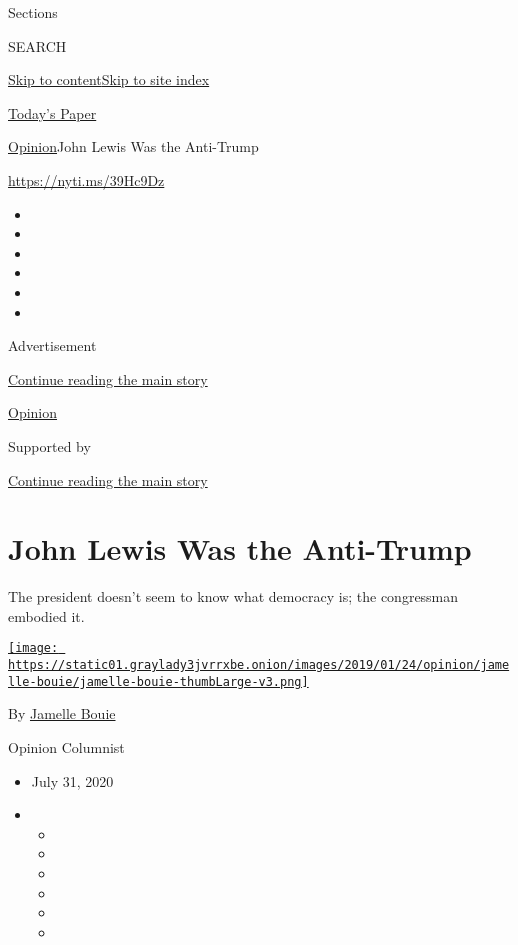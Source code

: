Sections

SEARCH

\protect\hyperlink{site-content}{Skip to
content}\protect\hyperlink{site-index}{Skip to site index}

\href{https://myaccount.nytimes3xbfgragh.onion/auth/login?response_type=cookie\&client_id=vi}{}

\href{https://www.nytimes3xbfgragh.onion/section/todayspaper}{Today's
Paper}

\href{/section/opinion}{Opinion}\textbar{}John Lewis Was the Anti-Trump

\url{https://nyti.ms/39Hc9Dz}

\begin{itemize}
\item
\item
\item
\item
\item
\item
\end{itemize}

Advertisement

\protect\hyperlink{after-top}{Continue reading the main story}

\href{/section/opinion}{Opinion}

Supported by

\protect\hyperlink{after-sponsor}{Continue reading the main story}

\hypertarget{john-lewis-was-the-anti-trump}{%
\section{John Lewis Was the
Anti-Trump}\label{john-lewis-was-the-anti-trump}}

The president doesn't seem to know what democracy is; the congressman
embodied it.

\href{https://www.nytimes3xbfgragh.onion/column/jamelle-bouie}{\texttt{[image: https://static01.graylady3jvrrxbe.onion/images/2019/01/24/opinion/jamelle-bouie/jamelle-bouie-thumbLarge-v3.png]}}

By
\href{https://www.nytimes3xbfgragh.onion/column/jamelle-bouie}{Jamelle
Bouie}

Opinion Columnist

\begin{itemize}
\item
  July 31, 2020
\item
  \begin{itemize}
  \item
  \item
  \item
  \item
  \item
  \item
  \end{itemize}
\end{itemize}

